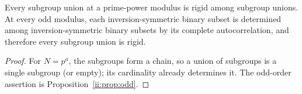 \begin{corollary}\label{ii:cor:primepower}
Every subgroup union at a prime-power modulus is rigid among subgroup unions.  At every odd modulus, each inversion-symmetric binary subset is determined among inversion-symmetric binary subsets by its complete autocorrelation, and therefore every subgroup union is rigid.
\end{corollary}
\begin{proof}
For $N=p^a$, the subgroups form a chain, so a union of subgroups is a single subgroup (or empty); its cardinality already determines it.  The odd-order assertion is Proposition~\ref{ii:prop:odd}.
\end{proof}

